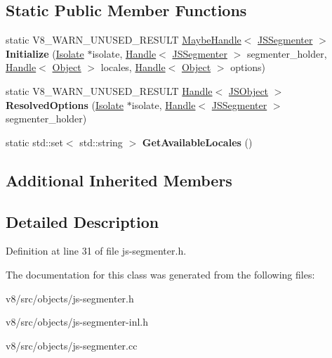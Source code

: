\subsection*{Static Public Member Functions}
\begin{DoxyCompactItemize}
\item 
\mbox{\label{classv8_1_1internal_1_1JSSegmenter_a0de8dee6e971c3c9b5361dcc06f4dff9}} 
static V8\+\_\+\+W\+A\+R\+N\+\_\+\+U\+N\+U\+S\+E\+D\+\_\+\+R\+E\+S\+U\+LT \mbox{\hyperlink{classv8_1_1internal_1_1MaybeHandle}{Maybe\+Handle}}$<$ \mbox{\hyperlink{classv8_1_1internal_1_1JSSegmenter}{J\+S\+Segmenter}} $>$ {\bfseries Initialize} (\mbox{\hyperlink{classv8_1_1internal_1_1Isolate}{Isolate}} $\ast$isolate, \mbox{\hyperlink{classv8_1_1internal_1_1Handle}{Handle}}$<$ \mbox{\hyperlink{classv8_1_1internal_1_1JSSegmenter}{J\+S\+Segmenter}} $>$ segmenter\+\_\+holder, \mbox{\hyperlink{classv8_1_1internal_1_1Handle}{Handle}}$<$ \mbox{\hyperlink{classv8_1_1internal_1_1Object}{Object}} $>$ locales, \mbox{\hyperlink{classv8_1_1internal_1_1Handle}{Handle}}$<$ \mbox{\hyperlink{classv8_1_1internal_1_1Object}{Object}} $>$ options)
\item 
\mbox{\label{classv8_1_1internal_1_1JSSegmenter_acd1815225517410faf96ee26111c97ba}} 
static V8\+\_\+\+W\+A\+R\+N\+\_\+\+U\+N\+U\+S\+E\+D\+\_\+\+R\+E\+S\+U\+LT \mbox{\hyperlink{classv8_1_1internal_1_1Handle}{Handle}}$<$ \mbox{\hyperlink{classv8_1_1internal_1_1JSObject}{J\+S\+Object}} $>$ {\bfseries Resolved\+Options} (\mbox{\hyperlink{classv8_1_1internal_1_1Isolate}{Isolate}} $\ast$isolate, \mbox{\hyperlink{classv8_1_1internal_1_1Handle}{Handle}}$<$ \mbox{\hyperlink{classv8_1_1internal_1_1JSSegmenter}{J\+S\+Segmenter}} $>$ segmenter\+\_\+holder)
\item 
\mbox{\label{classv8_1_1internal_1_1JSSegmenter_acf5d6ab3221e0685591c595795f4aa73}} 
static std\+::set$<$ std\+::string $>$ {\bfseries Get\+Available\+Locales} ()
\end{DoxyCompactItemize}
\subsection*{Additional Inherited Members}


\subsection{Detailed Description}


Definition at line 31 of file js-\/segmenter.\+h.



The documentation for this class was generated from the following files\+:\begin{DoxyCompactItemize}
\item 
v8/src/objects/js-\/segmenter.\+h\item 
v8/src/objects/js-\/segmenter-\/inl.\+h\item 
v8/src/objects/js-\/segmenter.\+cc\end{DoxyCompactItemize}
